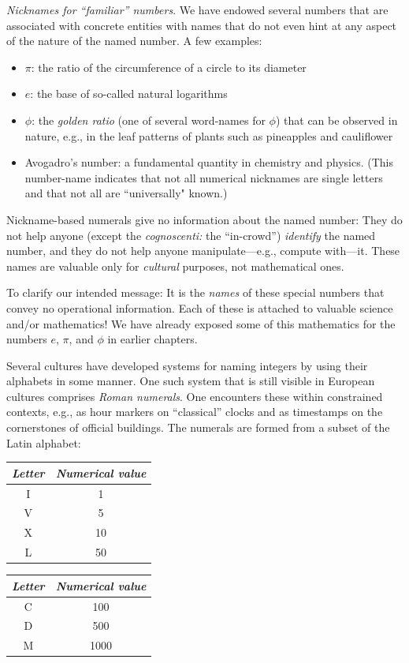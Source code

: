 \noindent
{\it Nicknames for ``familiar'' numbers}.
We have endowed several numbers that are associated with concrete entities with names that do not even hint at any aspect of the nature of the named number.  A few examples:
\begin{itemize}
\item
$\pi$: the ratio of the circumference of a circle to its diameter
\medskip\item
$e$: the base of so-called natural logarithms
\medskip\item
$\phi$: the {\it golden ratio} (one of several word-names for $\phi$) that can be observed in nature, e.g., in the leaf patterns of plants such as pineapples and cauliflower
\medskip\item
Avogadro's number: a fundamental quantity in chemistry and physics.  (This number-name indicates that not all numerical nicknames are single letters and that not all are ``universally" known.)
\end{itemize}
Nickname-based numerals give no information about the named number:  They do not help anyone (except the {\it cognoscenti:} the ``in-crowd'') {\em identify} the named number, and they do not help anyone manipulate---e.g., compute with---it.  These names are valuable only for {\em cultural} purposes, not mathematical ones.

\smallskip

To clarify our intended message: It is the {\em names} of these special numbers that convey no operational information.  Each of these is attached to valuable science and/or mathematics!  We have already exposed some of this mathematics for the numbers $e$, $\pi$, and $\phi$ in earlier chapters.

\bigskip

 

Several cultures have developed systems for naming integers by using their alphabets in some manner.  One such system that is still visible in European cultures comprises {\it Roman numerals}.  One encounters these within constrained contexts, e.g., as hour markers on ``classical'' clocks and as timestamps on the cornerstones of official buildings.  The numerals
are formed from a subset of the Latin alphabet:

\smallskip

{\small
\begin{tabular}{c|c}
{\it Letter} & {\it Numerical value} \\
\hline
I  & 1 \\
V  & 5 \\
X  & 10 \\
L  & 50
\end{tabular}
\hspace*{.5in}
\begin{tabular}{c|c}
{\it Letter} & {\it Numerical value} \\
\hline
C  & 100 \\
D  & 500 \\
M  & 1000
\end{tabular}
}

